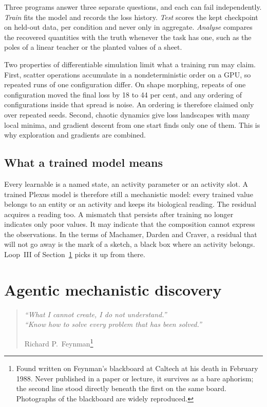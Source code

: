 \documentclass[11pt]{article}
\begin{document}
Three programs answer three separate questions, and each can fail independently.
\emph{Train} fits the model and records the loss history. \emph{Test} scores the kept
checkpoint on held-out data, per condition and never only in aggregate. \emph{Analyse}
compares the recovered quantities with the truth whenever the task has one, such as the
poles of a linear teacher or the planted values of a sheet.

Two properties of differentiable simulation limit what a training run may claim. First,
scatter operations accumulate in a nondeterministic order on a GPU, so repeated runs of
one configuration differ. On shape morphing, repeats of one configuration moved the final
loss by 18 to 44 per cent, and any ordering of configurations inside that spread is
noise. An ordering is therefore claimed only over repeated seeds. Second, chaotic dynamics
give loss landscapes with many local minima, and gradient descent from one start finds
only one of them. This is why exploration and gradients are combined.

\subsection{What a trained model means}

Every learnable is a named state, an activity parameter or an activity slot. A trained
Plexus model is therefore still a mechanistic model: every trained value belongs to an
entity or an activity and keeps its biological reading. The residual acquires a reading
too. A mismatch that persists after training no longer indicates only poor values. It may
indicate that the composition cannot express the observations. In the terms of Machamer,
Darden and Craver, a residual that will not go away is the mark of a sketch, a black box
where an activity belongs. Loop~III of Section~\ref{sec:agentic} picks it up from there.

\section{Agentic mechanistic discovery}\label{sec:agentic}

\begin{quote}
\emph{``What I cannot create, I do not understand.''} \\
\emph{``Know how to solve every problem that has been solved.''}

\hfill Richard P.\ Feynman\footnote{Found written on Feynman's blackboard at
Caltech at his death in February 1988. Never published in a paper or lecture, it
survives as a bare aphorism; the second line stood directly beneath the first on the
same board. Photographs of the blackboard are widely reproduced.}
\end{quote}
\end{document}

